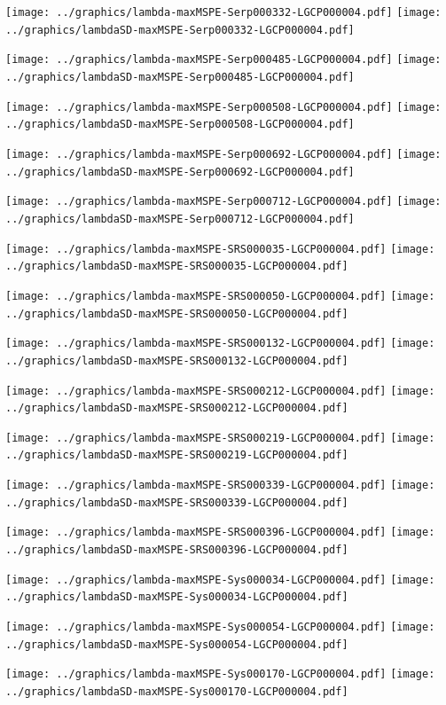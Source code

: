 \documentclass[review]{elsarticle}
\begin{document}
\texttt{[image: ../graphics/lambda-maxMSPE-Serp000332-LGCP000004.pdf]}
\texttt{[image: ../graphics/lambdaSD-maxMSPE-Serp000332-LGCP000004.pdf]}

\texttt{[image: ../graphics/lambda-maxMSPE-Serp000485-LGCP000004.pdf]}
\texttt{[image: ../graphics/lambdaSD-maxMSPE-Serp000485-LGCP000004.pdf]}

\texttt{[image: ../graphics/lambda-maxMSPE-Serp000508-LGCP000004.pdf]}
\texttt{[image: ../graphics/lambdaSD-maxMSPE-Serp000508-LGCP000004.pdf]}

\texttt{[image: ../graphics/lambda-maxMSPE-Serp000692-LGCP000004.pdf]}
\texttt{[image: ../graphics/lambdaSD-maxMSPE-Serp000692-LGCP000004.pdf]}

\texttt{[image: ../graphics/lambda-maxMSPE-Serp000712-LGCP000004.pdf]}
\texttt{[image: ../graphics/lambdaSD-maxMSPE-Serp000712-LGCP000004.pdf]}

\texttt{[image: ../graphics/lambda-maxMSPE-SRS000035-LGCP000004.pdf]}
\texttt{[image: ../graphics/lambdaSD-maxMSPE-SRS000035-LGCP000004.pdf]}

\texttt{[image: ../graphics/lambda-maxMSPE-SRS000050-LGCP000004.pdf]}
\texttt{[image: ../graphics/lambdaSD-maxMSPE-SRS000050-LGCP000004.pdf]}

\texttt{[image: ../graphics/lambda-maxMSPE-SRS000132-LGCP000004.pdf]}
\texttt{[image: ../graphics/lambdaSD-maxMSPE-SRS000132-LGCP000004.pdf]}

\texttt{[image: ../graphics/lambda-maxMSPE-SRS000212-LGCP000004.pdf]}
\texttt{[image: ../graphics/lambdaSD-maxMSPE-SRS000212-LGCP000004.pdf]}

\texttt{[image: ../graphics/lambda-maxMSPE-SRS000219-LGCP000004.pdf]}
\texttt{[image: ../graphics/lambdaSD-maxMSPE-SRS000219-LGCP000004.pdf]}

\texttt{[image: ../graphics/lambda-maxMSPE-SRS000339-LGCP000004.pdf]}
\texttt{[image: ../graphics/lambdaSD-maxMSPE-SRS000339-LGCP000004.pdf]}

\texttt{[image: ../graphics/lambda-maxMSPE-SRS000396-LGCP000004.pdf]}
\texttt{[image: ../graphics/lambdaSD-maxMSPE-SRS000396-LGCP000004.pdf]}

\texttt{[image: ../graphics/lambda-maxMSPE-Sys000034-LGCP000004.pdf]}
\texttt{[image: ../graphics/lambdaSD-maxMSPE-Sys000034-LGCP000004.pdf]}

\texttt{[image: ../graphics/lambda-maxMSPE-Sys000054-LGCP000004.pdf]}
\texttt{[image: ../graphics/lambdaSD-maxMSPE-Sys000054-LGCP000004.pdf]}

\texttt{[image: ../graphics/lambda-maxMSPE-Sys000170-LGCP000004.pdf]}
\texttt{[image: ../graphics/lambdaSD-maxMSPE-Sys000170-LGCP000004.pdf]}
\end{document}
